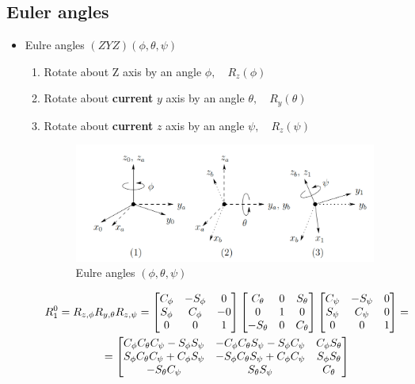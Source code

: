\documentclass{article}
\begin{document}
\subsection{Euler angles}
\begin{itemize}
    \item Eulre angles $(ZYZ) (\phi, \theta,\psi)$
    \begin{enumerate}
        \item Rotate about Z axis by an angle $\phi, \quad R_z(\phi)$
        \item Rotate about \textbf{current} $y$ axis by an angle $\theta,  \quad R_y(\theta)$
        \item Rotate about \textbf{current} $z$ axis by an angle $\psi,  \quad R_z(\psi)$
    \begin{figure}[h!]
\includegraphics[scale=1.5]{euler.png}
\caption{Eulre angles $(\phi, \theta,\psi)$}
\label{fig:sr}
\centering
\end{figure}

 \begin{multline*}
    R^{0}_{1} = R_{z,\phi}R_{y,\theta}R_{z,\psi} =
    \begin{bmatrix}
    C_\phi & -S_\phi & 0 \\
    S_\phi & C_\phi & -0 \\
    0 & 0 & 1
    \end{bmatrix}
    \begin{bmatrix}
    C_\theta & 0 & S_\theta \\
    0 & 1 & 0 \\
    -S_\theta & 0 & C_\theta
    \end{bmatrix}
    \begin{bmatrix}
    C_\psi & -S_\psi &  0 \\
    S_\psi & C_\psi & 0\\
    0 & 0 & 1 \\
    \end{bmatrix} =\\ =
    \linebreak
    \begin{bmatrix}
    C_\phi C_\theta C_\psi - S_\phi S_\psi  & -C_\phi C_\theta S_\psi - S_\phi C_\psi & C_\phi S_\theta \\
    S_\phi C_\theta  C_\psi + C_\phi S_\psi & -S_\phi C_\theta  S_\psi + C_\phi C_\psi & S_\phi S_\theta \\
    -S_\theta C_\psi & S_\theta S_\psi & C_\theta
    \end{bmatrix}
 \end{multline*}


\end{enumerate}
\end{itemize}
\end{document}
